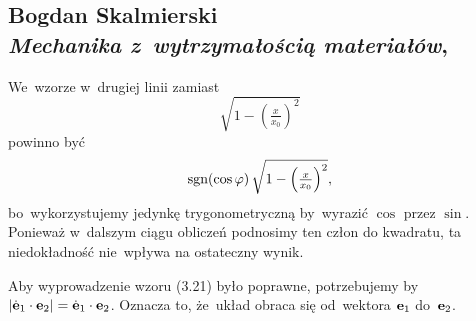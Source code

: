 \documentclass[a4paper,11pt]{article}
\numberwithin{equation}{section}
\begin{document}
\VerSpaceTwo













\newpage

\subsection{ %
  Bogdan Skalmierski \\
  \textit{Mechanika z~wytrzymałością materiałów},
  \cite{SkalmierskiMechanikaZWytrzymalosciaMaterialow1983}}

\vspace{0em}



\vspace{0em}


\noindent
{} We~wzorze w~drugiej linii zamiast
\begin{equation}
  \label{eq:Skalmierski-MechanikaZWytrzymalosciaETC-01}
  \sqrt{ 1 - \left( \tfrac{ x }{ x_{ 0 } } \right)^{ 2 } }
\end{equation}
powinno być
\begin{equation}
  \label{eq:SkalmierskiMechanikaZWytrzymaloscia-02}
  \textrm{sgn}( \cos \varphi ) \,
  \sqrt{ 1 - \left( \tfrac{ x }{ x_{ 0 } } \right)^{ 2 } },
\end{equation}
bo~wykorzystujemy jedynkę trygonometryczną by~wyrazić $\cos$ przez
$\sin$. Ponieważ w~dalszym ciągu obliczeń podnosimy ten człon do
kwadratu, ta niedokładność nie~wpływa na ostateczny wynik.

\VerSpaceFour





\noindent
{} Aby wyprowadzenie wzoru (3.21) było poprawne,
potrzebujemy by
$| \dot{ \mathbf{e} }_{ 1 } \cdot \mathbf{e}_{ 2 } | = \dot{ \mathbf{e} }_{ 1 }
\cdot \mathbf{e}_{ 2 }$. Oznacza to, że~układ obraca się od~wektora
$\mathbf{e}_{ 1 }$ do~$\mathbf{e}_{ 2 }$.





\newpage

\end{document}
